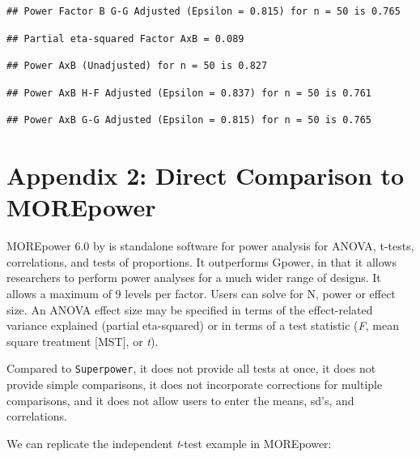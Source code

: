 \documentclass[
]{book}
\begin{document}
\begin{verbatim}
## Power Factor B G-G Adjusted (Epsilon = 0.815) for n = 50 is 0.765
\end{verbatim}

\begin{verbatim}
## Partial eta-squared Factor AxB = 0.089
\end{verbatim}

\begin{verbatim}
## Power AxB (Unadjusted) for n = 50 is 0.827
\end{verbatim}

\begin{verbatim}
## Power AxB H-F Adjusted (Epsilon = 0.837) for n = 50 is 0.761
\end{verbatim}

\begin{verbatim}
## Power AxB G-G Adjusted (Epsilon = 0.815) for n = 50 is 0.765
\end{verbatim}

\hypertarget{appendix-2-direct-comparison-to-morepower}{%
\chapter*{Appendix 2: Direct Comparison to MOREpower}\label{appendix-2-direct-comparison-to-morepower}}

MOREpower 6.0 by \citet{Campbell2012MorePower6F} is standalone software for power analysis for ANOVA, t-tests, correlations, and tests of proportions. It outperforms Gpower, in that it allows researchers to perform power analyses for a much wider range of designs. It allows a maximum of 9 levels per factor. Users can solve for N, power or effect size. An ANOVA effect size may be specified in terms of the effect-related variance explained (partial eta-squared) or in terms of a test statistic (\emph{F}, mean square treatment {[}MST{]}, or \emph{t}).

Compared to \texttt{Superpower}, it does not provide all tests at once, it does not provide simple comparisons, it does not incorporate corrections for multiple comparisons, and it does not allow users to enter the means, sd's, and correlations.

We can replicate the independent \emph{t}-test example in MOREpower:
\end{document}
